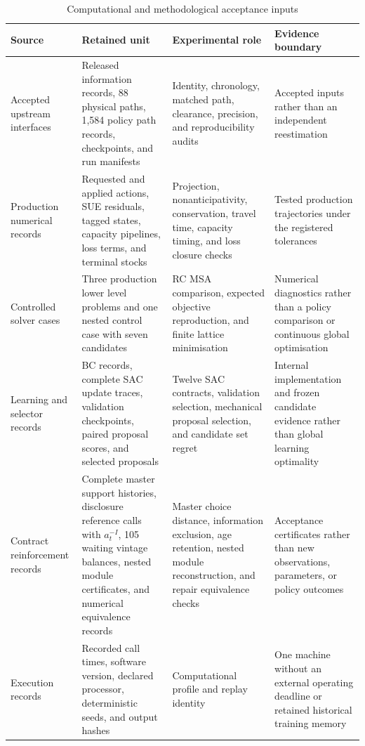 \documentclass[a4paper,fleqn]{cas-sc}
\begin{document}
\begingroup
\setlength{\tabcolsep}{4pt}
\begin{table}[t]
\centering
\caption{Computational and methodological acceptance inputs}
\label{tab:525-acceptance-inputs}
\begin{tabular}{>{\RaggedRight\arraybackslash}p{}
                >{\RaggedRight\arraybackslash}p{}
                >{\RaggedRight\arraybackslash}p{}
                >{\RaggedRight\arraybackslash}p{}}
\toprule
Source & Retained unit & Experimental role & Evidence boundary \\
\midrule
Accepted upstream interfaces
& Released information records, 88 physical paths, 1,584 policy path records, checkpoints, and run manifests
& Identity, chronology, matched path, clearance, precision, and reproducibility audits
& Accepted inputs rather than an independent reestimation \\
Production numerical records
& Requested and applied actions, SUE residuals, tagged states, capacity pipelines, loss terms, and terminal stocks
& Projection, nonanticipativity, conservation, travel time, capacity timing, and loss closure checks
& Tested production trajectories under the registered tolerances \\
Controlled solver cases
& Three production lower level problems and one nested control case with seven candidates
& RC MSA comparison, expected objective reproduction, and finite lattice minimisation
& Numerical diagnostics rather than a policy comparison or continuous global optimisation \\
Learning and selector records
& BC records, complete SAC update traces, validation checkpoints, paired proposal scores, and selected proposals
& Twelve SAC contracts, validation selection, mechanical proposal selection, and candidate set regret
& Internal implementation and frozen candidate evidence rather than global learning optimality \\
Contract reinforcement records
& Complete master support histories, disclosure reference calls with $a_t^{-I}$, 105 waiting vintage balances, nested module certificates, and numerical equivalence records
& Master choice distance, information exclusion, age retention, nested module reconstruction, and repair equivalence checks
& Acceptance certificates rather than new observations, parameters, or policy outcomes \\
Execution records
& Recorded call times, software version, declared processor, deterministic seeds, and output hashes
& Computational profile and replay identity
& One machine without an external operating deadline or retained historical training memory \\
\bottomrule
\end{tabular}
\end{table}
\endgroup
\end{document}
